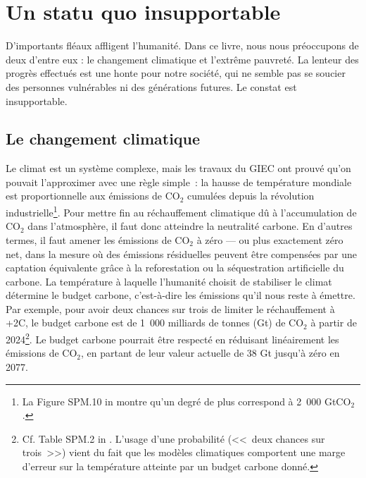 \documentclass[a5paper,french]{memoir}
\begin{document}
\chapter{Un statu quo insupportable\label{ch:statu_quo}}

D'importants fléaux affligent l'humanité. Dans ce livre, nous nous préoccupons de deux d'entre eux : le changement climatique et l'extrême pauvreté. La lenteur des progrès effectués est une honte pour notre société, qui ne semble pas se soucier des personnes vulnérables ni des générations futures. Le constat est insupportable.

\section{Le changement climatique}

Le climat est un système complexe, mais les travaux du GIEC ont prouvé qu'on pouvait l'approximer avec une règle simple~: la hausse de température mondiale est proportionnelle aux émissions de CO$_\text{2}$ cumulées depuis la révolution industrielle\footnote{La Figure SPM.10 in \citet{ipcc_climate_2021} montre qu'un degré de plus correspond à 2~000 GtCO$_\text{2}$.}. Pour mettre fin au réchauffement climatique dû à l'accumulation de CO$_\text{2}$ dans l'atmosphère, il faut donc atteindre la neutralité carbone. En d'autres termes, il faut amener les émissions de CO$_\text{2}$ à zéro --- ou plus exactement zéro net, dans la mesure où des émissions résiduelles peuvent être compensées par une captation équivalente grâce à la reforestation ou la séquestration artificielle du carbone. La température à laquelle l'humanité choisit de stabiliser le climat détermine le budget carbone, c'est-à-dire les émissions qu'il nous reste à émettre. Par exemple, pour avoir deux chances sur trois de limiter le réchauffement à +2\textdegree{}C, le budget carbone est de 1~000 milliards de tonnes (Gt) de CO$_\text{2}$ à partir de 2024\footnote{Cf. Table SPM.2 in \citet{ipcc_climate_2021}. L'usage d'une probabilité (<<~deux chances sur trois~>>) vient du fait que les modèles climatiques comportent une marge d'erreur sur la température atteinte par un budget carbone donné.}. Le budget carbone pourrait être respecté en réduisant linéairement les émissions de CO$_\text{2}$, en partant de leur valeur actuelle de 38 Gt jusqu'à zéro en 2077. 
\end{document}

